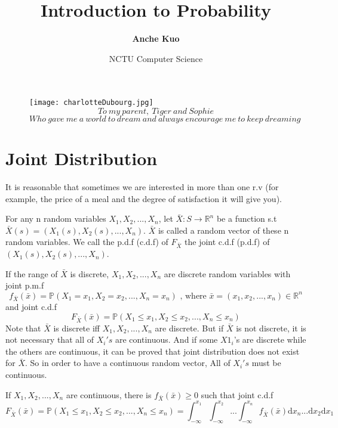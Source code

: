 \documentclass[a4paper,12pt]{article}
\title{\textbf{Introduction to Probability}}
\author{\textbf{Anche Kuo}}
\date{NCTU Computer Science}
\begin{document}
\maketitle

\begin{figure}[ht!]
\centering
\texttt{[image: charlotteDubourg.jpg]}
 
$$To\ my\ parent,\ Tiger\ and\ Sophie$$
$$Who\ gave\ me\ a\ world\ to\ dream\ and\ always\ encourage\ me\ to\ keep\ dreaming$$
\label{overflow}
\end{figure}

\newpage
\tableofcontents

\newpage
\newpage
\section{Joint Distribution}
It is reasonable that sometimes we are interested in more than one r.v (for example, the price of a meal and the degree of satisfaction it will give you). 

For any n random variables $X_1, X_2, ..., X_n$, let $\bar{X} : S \to \mathbb{R}^n$ be a function s.t $\bar{X}(s) = (X_1(s), X_2(s), ..., X_n)$.  $\bar{X}$ is called a random vector of these n random variables. We call the p.d.f (c.d.f) of $F_{\bar{X}}$ the joint c.d.f (p.d.f) of $(X_1(s), X_2(s), ..., X_n)$.

If the range of $\bar{X}$ is discrete, $X_1, X_2, ..., X_n$ are discrete random variables with joint p.m.f
$$f_{\bar{X}}(\bar{x}) = \mathbb{P}( X_1 = x_1, X_2 = x_2, ..., X_n = x_n )\text{ , where }\bar{x} = (x_1, x_2, ..., x_n) \in \mathbb{R}^n $$
and joint c.d.f
$$F_{\bar{X}}(\bar{x}) = \mathbb{P}( X_1 \leq x_1, X_2 \leq x_2, ..., X_n \leq x_n )$$
Note that $\bar{X}$ is discrete iff $X_1, X_2, ..., X_n$ are discrete. But if $\bar{X}$ is not discrete, it is not necessary that all of $X_i's$ are continuous. And if some $X1_i$'s are discrete while the others are continuous, it can be proved that joint distribution does not exist for $\bar{X}$. So in order to have a continuous random vector, All of $X_i's$ must be continuous.

If $X_1, X_2, ..., X_n$ are continuous, there is $f_{\bar{X}}(\bar{x}) \geq 0$ such that joint c.d.f
$$F_{\bar{X}}(\bar{x}) = \mathbb{P}( X_1 \leq x_1, X_2 \leq x_2, ..., X_n\leq x_n ) = \int_{-\infty}^{x_1}\int_{-\infty}^{x_2}...\int_{-\infty}^{x_n} f_{\bar{X}}(\bar{x}) \mathrm{d}x_n ... \mathrm{d}x_2 \mathrm{d}x_1$$
\end{document}

